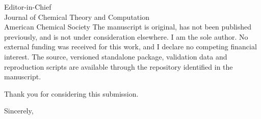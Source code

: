 \documentclass[10pt]{letter}
\begin{document}
\begin{letter}{Editor-in-Chief\\
Journal of Chemical Theory and Computation\\
American Chemical Society}
The manuscript is original, has not been published previously, and is not
under consideration elsewhere. I am the sole author. No external funding was
received for this work, and I declare no competing financial interest. The
source, versioned standalone package, validation data and reproduction scripts
are available through the repository identified in the manuscript.

Thank you for considering this submission.

\closing{Sincerely,}

\end{letter}
\end{document}
